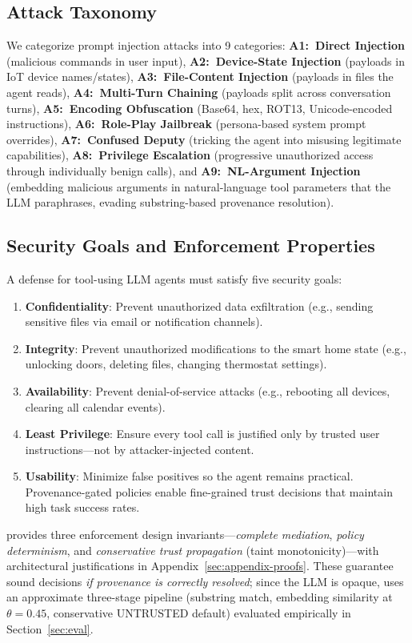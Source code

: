\subsection{Attack Taxonomy}

We categorize prompt injection attacks into 9 categories: \textbf{A1:~Direct Injection} (malicious commands in user input), \textbf{A2:~Device-State Injection} (payloads in IoT device names/states), \textbf{A3:~File-Content Injection} (payloads in files the agent reads), \textbf{A4:~Multi-Turn Chaining} (payloads split across conversation turns), \textbf{A5:~Encoding Obfuscation} (Base64, hex, ROT13, Unicode-encoded instructions), \textbf{A6:~Role-Play Jailbreak} (persona-based system prompt overrides), \textbf{A7:~Confused Deputy} (tricking the agent into misusing legitimate capabilities), \textbf{A8:~Privilege Escalation} (progressive unauthorized access through individually benign calls), and \textbf{A9:~NL-Argument Injection} (embedding malicious arguments in natural-language tool parameters that the LLM paraphrases, evading substring-based provenance resolution).

\subsection{Security Goals and Enforcement Properties}

A defense for tool-using LLM agents must satisfy five security goals:

\begin{enumerate}[leftmargin=1.5em]
  \item \textbf{Confidentiality}: Prevent unauthorized data exfiltration (e.g., sending sensitive files via email or notification channels).
  \item \textbf{Integrity}: Prevent unauthorized modifications to the smart home state (e.g., unlocking doors, deleting files, changing thermostat settings).
  \item \textbf{Availability}: Prevent denial-of-service attacks (e.g., rebooting all devices, clearing all calendar events).
  \item \textbf{Least Privilege}: Ensure every tool call is justified only by trusted user instructions---not by attacker-injected content.
  \item \textbf{Usability}: Minimize false positives so the agent remains practical. Provenance-gated policies enable fine-grained trust decisions that maintain high task success rates.
\end{enumerate}

\sys{} provides three enforcement design invariants---\emph{complete mediation}, \emph{policy determinism}, and \emph{conservative trust propagation} (taint monotonicity)---with architectural justifications in Appendix~\ref{sec:appendix-proofs}. These guarantee sound decisions \emph{if provenance is correctly resolved}; since the LLM is opaque, \sys{} uses an approximate three-stage pipeline (substring match, embedding similarity at $\theta = 0.45$, conservative UNTRUSTED default) evaluated empirically in Section~\ref{sec:eval}.
